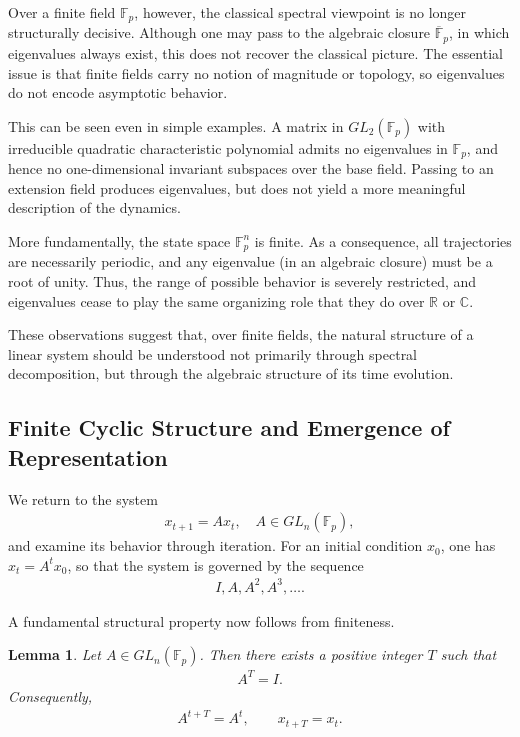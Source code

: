 \documentclass[letterpaper, 9pt, conference]{ieeeconf}
\newtheorem{lemma}[theorem]{Lemma}
\begin{document}
Over a finite field \(\mathbb{F}_p\), however, the classical spectral viewpoint
is no longer structurally decisive. Although one may pass to the algebraic
closure $\overline{\mathbb{F}}_p$, in which eigenvalues always exist, this does
not recover the classical picture. The essential issue is that finite fields
carry no notion of magnitude or topology, so eigenvalues do not encode
asymptotic behavior.

This can be seen even in simple examples. A matrix in $GL_2(\mathbb{F}_p)$ with
irreducible quadratic characteristic polynomial admits no eigenvalues in
$\mathbb{F}_p$, and hence no one-dimensional invariant subspaces over the base
field. Passing to an extension field produces eigenvalues, but does not yield a
more meaningful description of the dynamics.

More fundamentally, the state space $\mathbb{F}_p^n$ is finite. As a consequence,
all trajectories are necessarily periodic, and any eigenvalue (in an algebraic
closure) must be a root of unity. Thus, the range of possible behavior is
severely restricted, and eigenvalues cease to play the same organizing role that
they do over $\mathbb{R}$ or $\mathbb{C}$.

These observations suggest that, over finite fields, the natural structure of a
linear system should be understood not primarily through spectral decomposition,
but through the algebraic structure of its time evolution.

\subsection{Finite Cyclic Structure and Emergence of Representation}

We return to the system
\begin{eqnarray}
x_{t+1} = A x_t, \quad A \in GL_n(\mathbb{F}_p),
\end{eqnarray}
and examine its behavior through iteration. For an initial condition $x_0$, one
has $x_t = A^t x_0$, so that the system is governed by the sequence
\begin{eqnarray}
I, A, A^2, A^3, \dots.
\end{eqnarray}

A fundamental structural property now follows from finiteness.

\begin{lemma}
Let $A \in GL_n(\mathbb{F}_p)$. Then there exists a positive integer $T$ such
that
\begin{eqnarray}
A^T = I.
\end{eqnarray}
Consequently,
\begin{eqnarray}
A^{t+T} = A^t, \qquad x_{t+T} = x_t.
\end{eqnarray}
\end{lemma}
\end{document}

